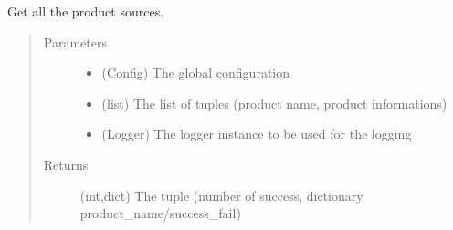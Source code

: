 \documentclass[a4paper,10pt,english]{sphinxmanual}
\begin{document}
\begin{fulllineitems}
\label{\detokenize{apidoc_commands/commands:commands.source.get_all_product_sources}}
Get all the product sources.
\begin{quote}\begin{description}
\item[{Parameters}] \leavevmode\begin{itemize}
\item {} 
 \textendash{} (Config) The global configuration

\item {} 
 \textendash{} (list) 
The list of tuples (product name, product informations)

\item {} 
 \textendash{} (Logger) 
The logger instance to be used for the logging

\end{itemize}

\item[{Returns}] \leavevmode
(int,dict) 
The tuple (number of success, dictionary product\_name/success\_fail)

\end{description}\end{quote}

\end{fulllineitems}

\end{document}
